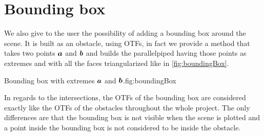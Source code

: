 \documentclass[dissertation.tex]{subfiles}
\begin{document}
\section{Bounding box}
We also give to the user the possibility of adding a
bounding box around the scene. It is built as an obstacle, using
\acp{OTF}, in fact we provide a method that takes two points $\boldsymbol{a}$
and $\boldsymbol{b}$ and builds the parallelpiped having those points as
extremes and with
all the faces triangularized like in \cref{fig:boundingBox}.
\begin{myfig}{Bounding box with extremes $\boldsymbol{a}$ and $\boldsymbol{b}$.}{fig:boundingBox}
\end{myfig}

In regards to the intersections, the \acp{OTF} of the bounding box are
considered exactly like the \acp{OTF} of the obstacles throughout the
whole project. The only differences are
that the bounding box is not visible when the scene is plotted and a
point inside the bounding box is not considered to be inside the obstacle.
\end{document}
